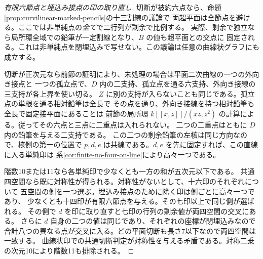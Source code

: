 \begin{proof}[有限六節点と埋込み接点の印の取り直し]
切断が被約六点なら、命題\ref{prop:curvilinear-marked-pencils}の十三割線の議論で
両超平面は全節点を避ける。ここでは非単純点の\emph{全て}で二行列が剰余で比例する。
実際、剰余で独立なら局所環全域での鉛筆が一定割線となり、$B$ の値も超平面との交点に
固定される。これは非単純点を閉埋込みで写せない。この議論は任意の曲線状グラフにも成立する。

切断が正次元なら前節の証明により、未処理の場合は平面二次曲線の一つの外向き接点と
一つの孤立点で、$D$ 内の二支持、孤立点を通る六支持、外向き接線の三支持が各上界を使い切る。
$Z$ に別の支持が入らないことも同じである。孤立点の単根を通る相対鉛筆は全長で
その点を通り、外向き接線を持つ相対鉛筆も全長で固定接平面にあることは
前節の局所環 $k[[x,z]]/(xz,z^2)$ の計算による。従ってその六点と三点に二重点は入れられない。
二つの二重点はともに $D$ 内の鉛筆を与える二支持である。
この二つの剰余鉛筆の左核は同じ方向なので、核側の第一の位置で
$p,d,e$ は共線である。$d,e$ を先に固定すれば、この直線に入る単純印は
系\ref{cor:finite-no-four-on-line}により高々一つである。

階数10または11なら各単純印で少なくとも一方の和が五次元以下である。
共通四空間なら既に対称性が得られる。対称性がないとして、十六印のそれぞれについて
五空間の側を一つ選ぶ。埋込み接点のために除く印は側ごとに高々一つであり、
少なくとも十四印が有限六節点を与える。その七印以上で同じ側が選ばれる。
その側で $d$ を印に取り直すと七印の行列の剰余値が両四空間の交叉にある。
さらに $d$ 自身の二つの値は同じであり、それぞれの座標が閉埋込みなので
合計八つの異なる点が交叉に入る。どの平面切断も長さ7以下なので両四空間は一致する。
曲線状印での共通切断判定が対称性を与える矛盾である。対称二乗の次元10により階数11も排除される。
\end{proof}
